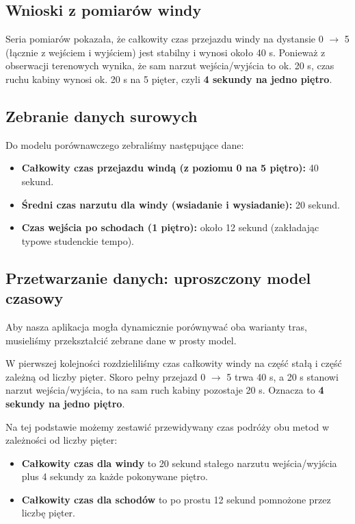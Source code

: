 \documentclass[14pt,a4paper]{extarticle}
\begin{document}
\subsection{Wnioski z pomiarów windy}
Seria pomiarów pokazała, że całkowity czas przejazdu windy na dystansie 0 $\rightarrow$ 5 (łącznie z wejściem i wyjściem) jest stabilny i wynosi około 40 s. Ponieważ z obserwacji terenowych wynika, że sam narzut wejścia/wyjścia to ok. 20 s, czas ruchu kabiny wynosi ok. 20 s na 5 pięter, czyli \textbf{4 sekundy na jedno piętro}.

\subsection{Zebranie danych surowych}
Do modelu porównawczego zebraliśmy następujące dane:
\begin{itemize}
    \item \textbf{Całkowity czas przejazdu windą (z poziomu 0 na 5 piętro):} 40 sekund.
    \item \textbf{Średni czas narzutu dla windy (wsiadanie i wysiadanie):} 20 sekund.
    \item \textbf{Czas wejścia po schodach (1 piętro):} około 12 sekund (zakładając typowe studenckie tempo).
\end{itemize}

\subsection{Przetwarzanie danych: uproszczony model czasowy}
Aby nasza aplikacja mogła dynamicznie porównywać oba warianty tras, musieliśmy przekształcić zebrane dane w prosty model.

W pierwszej kolejności rozdzieliliśmy czas całkowity windy na część stałą i część zależną od liczby pięter. Skoro pełny przejazd 0 $\rightarrow$ 5 trwa 40 s, a 20 s stanowi narzut wejścia/wyjścia, to na sam ruch kabiny pozostaje 20 s. Oznacza to \textbf{4 sekundy na jedno piętro}.

Na tej podstawie możemy zestawić przewidywany czas podróży obu metod w zależności od liczby pięter:
\begin{itemize}
    \item \textbf{Całkowity czas dla windy} to 20 sekund stałego narzutu wejścia/wyjścia plus 4 sekundy za każde pokonywane piętro.
    \item \textbf{Całkowity czas dla schodów} to po prostu 12 sekund pomnożone przez liczbę pięter.
\end{itemize}
\end{document}
